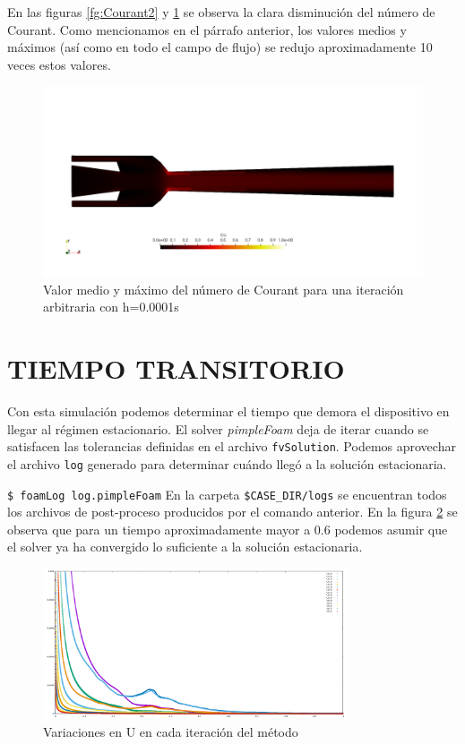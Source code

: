 \documentclass[oneside,a4paper,spanish,links]{amca}
\begin{document}
En las figuras \ref{fg:Courant2} y \ref{fg:pvCourant2} se observa la clara disminución del número de Courant. Como mencionamos en el párrafo anterior, los valores medios y máximos (así como en todo el campo de flujo) se redujo aproximadamente 10 veces estos valores.

\begin{figure}[htb]
	\centerline{\includegraphics[width=1\textwidth]{Figuras/03_pvCourant2.png}} 
	\caption{Valor medio y máximo del número de Courant para una iteración arbitraria con h=0.0001s} \label{fg:pvCourant2}
\end{figure}

\section{TIEMPO TRANSITORIO}
Con esta simulación podemos determinar el tiempo que demora el dispositivo en llegar al régimen estacionario. El solver \textit{pimpleFoam} deja de iterar cuando se satisfacen las tolerancias definidas en el archivo \texttt{fvSolution}. Podemos aprovechar el archivo \texttt{log} generado para determinar cuándo llegó a la solución estacionaria.

\texttt{\$ foamLog log.pimpleFoam}
En la carpeta \texttt{\$CASE\_DIR/logs} se encuentran todos los archivos de post-proceso producidos por el comando anterior. En la figura \ref{fg:iter0} se observa que para un tiempo aproximadamente mayor a 0.6 podemos asumir que el solver ya ha convergido lo suficiente a la solución estacionaria. 

\begin{figure}[htb]
	\centerline{\includegraphics[width=0.8\textwidth]{Figuras/04_iter.png}} 
	\caption{Variaciones en U en cada iteración del método} \label{fg:iter0}
\end{figure}
\end{document}
